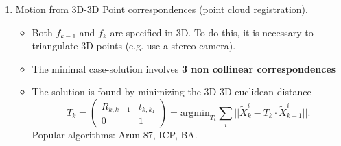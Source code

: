 \documentclass[a4paper,12 pt]{article}
\theoremstyle{definition}
\theoremstyle{remark}
\theoremstyle{definition}
\theoremstyle{definition}
\theoremstyle{definition}
\theoremstyle{remark}
\theoremstyle{definition}
\begin{document}
\begin{enumerate}[\textbf{3D to 3D}]
\item Motion from 3D-3D Point correspondences (point cloud registration).
\begin{itemize}
\item Both $f_{k-1}$ and $f_k$ are specified in 3D. To do this, it is necessary to triangulate 3D points (e.g. use a stereo camera).
\item The minimal case-solution involves \textbf{3 non collinear correspondences}
\item The solution is found by minimizing the 3D-3D euclidean distance
\begin{equation}
T_k=\begin{pmatrix}
R_{k,k-1} & t_{k,k_1}\\
0&1
\end{pmatrix}=\text{argmin}_{T_k}\sum_{i}||\tilde{X}_k^i-T_k\cdot \tilde{X}_{k-1}^i||.
\end{equation}
Popular algorithms: Arun 87, ICP, BA.
\end{itemize}
\end{enumerate}
\end{document}
